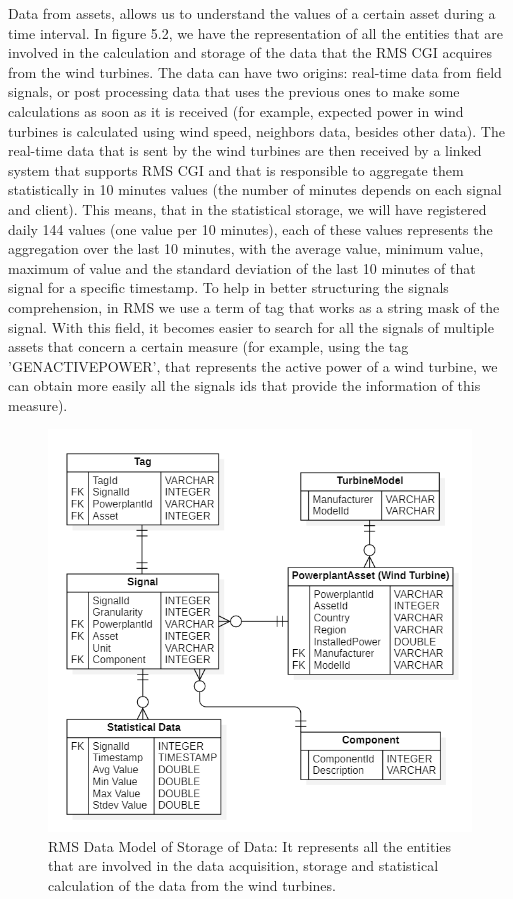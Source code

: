 Data from assets, allows us to understand the values of a certain asset during a time interval. In figure 5.2, we have the representation of all the entities that are involved in the calculation and storage of the data that the RMS CGI acquires from the wind turbines.
The data can have two origins: real-time data from field signals, or post processing data that uses the previous ones to make some calculations as soon as it is received (for example, expected power in wind turbines is calculated using wind speed, neighbors data, besides other data).
The real-time data that is sent by the wind turbines are then received by a linked system that supports RMS CGI and that is responsible to aggregate them statistically in 10 minutes values (the number of minutes depends on each signal and client). This means, that in the statistical storage, we will have registered daily 144 values (one value per 10 minutes), each of these values represents the aggregation over the last 10 minutes, with the average value, minimum value, maximum of value and the standard deviation of the last 10 minutes of that signal for a specific timestamp.
To help in better structuring the signals comprehension, in RMS we use a term of tag that works as a string mask of the signal. With this field, it becomes easier to search for all the signals of multiple assets that concern a certain measure (for example, using the tag 'GENACTIVEPOWER', that represents the active power of a wind turbine, we can obtain more easily all the signals ids that provide the information of this measure).

\begin{figure}[htbp]
	\centering
	\includegraphics[scale=0.7]{Chapters/Figures/methodology_fig11.png}
	\caption{RMS Data Model of Storage of Data: It represents all the entities that are involved in the data acquisition, storage and statistical calculation of the data from the wind turbines.}
	\label{fig:Figuras_Tree_silhouettes-vectorial}
\end{figure}


